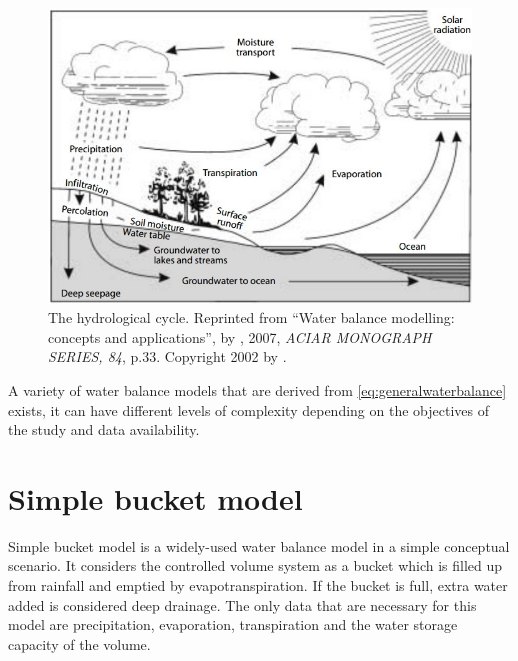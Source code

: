 \begin{figure}[bth]
\begin{center}
\includegraphics[width=.85\linewidth]{gfx/hydrocycle}
\end{center}
\caption{The hydrological cycle\citep{Zhang2002}. Reprinted from ``Water balance modelling: concepts and applications'', by \citeauthor{Zhang2002}, 2007, \emph{ACIAR MONOGRAPH SERIES, 84}, p.33. Copyright 2002 by \citeauthor{Zhang2002}.  }
\label{fig:hydrocycle}
\end{figure}
\newline
A variety of water balance models that are derived from \autoref{eq:generalwaterbalance} exists, it can have different levels of complexity depending on the objectives of the study and data availability. 
\section{Simple bucket model}
Simple bucket model is a widely-used water balance model in a simple conceptual scenario. It considers the controlled volume system as a bucket which is filled up from rainfall and emptied by evapotranspiration. If the bucket is full, extra water added is considered deep drainage. The only data that are necessary for this model are precipitation, evaporation, transpiration and the water storage capacity of the volume. 
